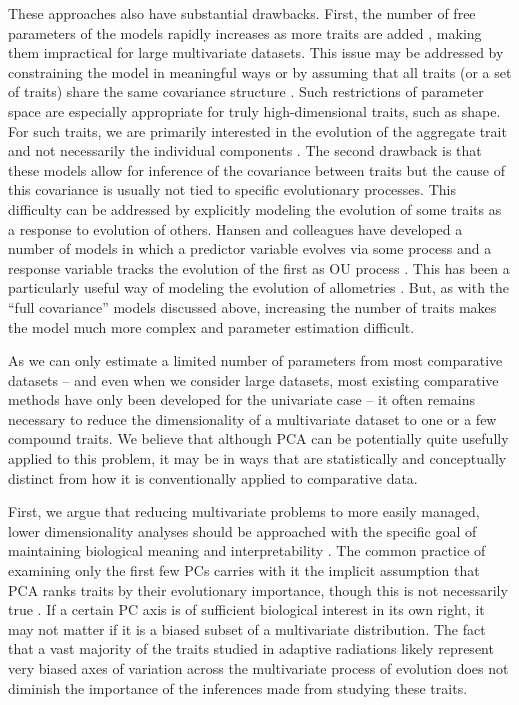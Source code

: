 \documentclass[a4paper,11pt]{article}
\begin{document}
These approaches also have substantial drawbacks. First, the number of free parameters of the models rapidly increases as more traits are added \citep{RevellHarmon2008}, making them impractical for large multivariate datasets. This issue may be addressed by constraining the model in meaningful ways \citep{ButlerKing2004} or by assuming that all traits (or a set of traits) share the same covariance structure \citep{Klingenberg2013, Adams2014, Adams2014b}. Such restrictions of parameter space are especially appropriate for truly high-dimensional traits, such as shape. For such traits, we are primarily interested in the evolution of the aggregate trait and not necessarily the individual components \citep{Adams2014}. The second drawback is that these models allow for inference of the covariance between traits but the cause of this covariance is usually not tied to specific evolutionary processes. This difficulty can be addressed by explicitly modeling the evolution of some traits as a response to evolution of others. Hansen and colleagues have developed a number of models in which a predictor variable evolves via some process and a response variable tracks the evolution of the first as OU process \citep{Hansen2008, Hansen2012SysBio, Bartoszek2012}. This has been a particularly useful way of modeling the evolution of allometries \citep[e.g.,][]{Hansen2012SysBio, Voje2013, Bolstad2014}. But, as with the ``full covariance''  models discussed above, increasing the number of traits makes the model much more complex and parameter estimation difficult.

As we can only estimate a limited number of parameters from most comparative datasets -- and even when we consider large datasets, most existing comparative methods have only been developed for the univariate case -- it often remains necessary to reduce the dimensionality of a multivariate dataset to one or a few compound traits. We believe that although PCA can be potentially quite usefully applied to this problem, it may be in ways that are statistically and conceptually distinct from how it is conventionally applied to comparative data. 

First, we argue that reducing multivariate problems to more easily managed, lower dimensionality analyses should be approached with the specific goal of maintaining biological meaning and interpretability \citep{Houle2011}. The common practice of examining only the first few PCs carries with it the implicit assumption that PCA ranks traits by their evolutionary importance, though this is not necessarily true \citep{Polly2013}. If a certain PC axis is of sufficient biological interest in its own right, it may not matter if it is a biased subset of a multivariate distribution. The fact that a vast majority of the traits studied in adaptive radiations likely represent very biased axes of variation across the multivariate process of evolution does not diminish the importance of the inferences made from studying these traits. 
\end{document}
